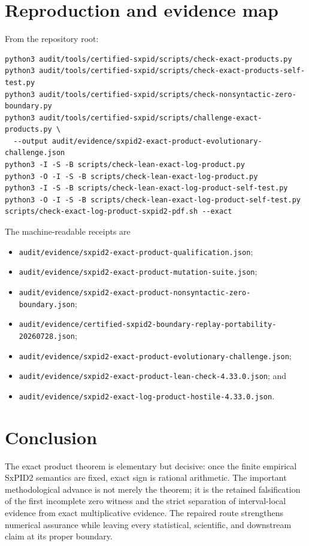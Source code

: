 \documentclass[11pt]{article}
\theoremstyle{definition}
\begin{document}
\section{Reproduction and evidence map}

From the repository root:
\begin{lstlisting}
python3 audit/tools/certified-sxpid/scripts/check-exact-products.py
python3 audit/tools/certified-sxpid/scripts/check-exact-products-self-test.py
python3 audit/tools/certified-sxpid/scripts/check-nonsyntactic-zero-boundary.py
python3 audit/tools/certified-sxpid/scripts/challenge-exact-products.py \
  --output audit/evidence/sxpid2-exact-product-evolutionary-challenge.json
python3 -I -S -B scripts/check-lean-exact-log-product.py
python3 -O -I -S -B scripts/check-lean-exact-log-product.py
python3 -I -S -B scripts/check-lean-exact-log-product-self-test.py
python3 -O -I -S -B scripts/check-lean-exact-log-product-self-test.py
scripts/check-exact-log-product-sxpid2-pdf.sh --exact
\end{lstlisting}

The machine-readable receipts are
\begin{itemize}[leftmargin=*]
  \item \texttt{audit/evidence/sxpid2-exact-product-qualification.json};
  \item \texttt{audit/evidence/sxpid2-exact-product-mutation-suite.json};
  \item \texttt{audit/evidence/sxpid2-exact-product-nonsyntactic-zero-boundary.json};
  \item \texttt{audit/evidence/certified-sxpid2-boundary-replay-portability-20260728.json};
  \item \texttt{audit/evidence/sxpid2-exact-product-evolutionary-challenge.json};
  \item \texttt{audit/evidence/sxpid2-exact-product-lean-check-4.33.0.json}; and
  \item \texttt{audit/evidence/sxpid2-exact-log-product-hostile-4.33.0.json}.
\end{itemize}

\section{Conclusion}

The exact product theorem is elementary but decisive: once the finite empirical SxPID2 semantics
are fixed, exact sign is rational arithmetic.  The important methodological advance is not merely
the theorem; it is the retained falsification of the first incomplete zero witness and the strict
separation of interval-local evidence from exact multiplicative evidence.  The repaired route
strengthens numerical assurance while leaving every statistical, scientific, and downstream
claim at its proper boundary.
\end{document}
